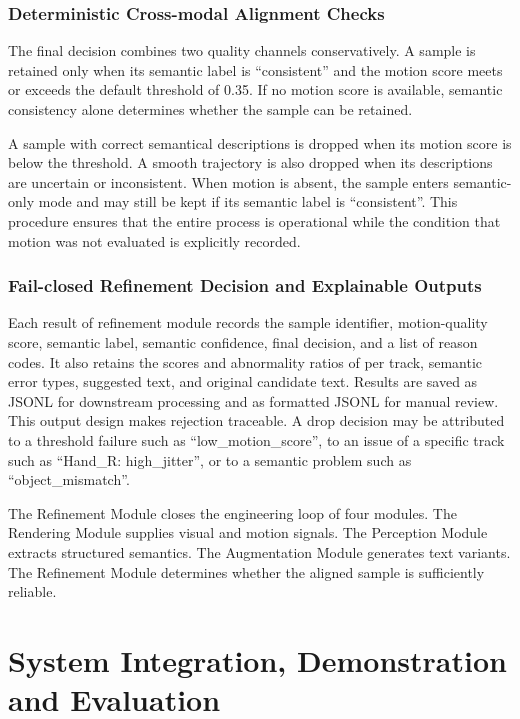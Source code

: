 \documentclass[11pt,oneside]{report}
\begin{document}
\subsection{Deterministic Cross-modal Alignment Checks}

The final decision combines two quality channels conservatively. A sample is retained only when its semantic label is “consistent” and the motion score meets or exceeds the default threshold of 0.35. If no motion score is available, semantic consistency alone determines whether the sample can be retained.

A sample with correct semantical descriptions is dropped when its motion score is below the threshold. A smooth trajectory is also dropped when its descriptions are uncertain or inconsistent. When motion is absent, the sample enters semantic-only mode and may still be kept if its semantic label is “consistent”. This procedure ensures that the entire process is operational while the condition that motion was not evaluated is explicitly recorded.

\subsection{Fail-closed Refinement Decision and Explainable Outputs}

Each result of refinement module records the sample identifier, motion-quality score, semantic label, semantic confidence, final decision, and a list of reason codes. It also retains the scores and abnormality ratios of per track, semantic error types, suggested text, and original candidate text. Results are saved as JSONL for downstream processing and as formatted JSONL for manual review. This output design makes rejection traceable. A drop decision may be attributed to a threshold failure such as “low\_motion\_score”, to an issue of a specific track such as “Hand\_R: high\_jitter”, or to a semantic problem such as “object\_mismatch”.

The Refinement Module closes the engineering loop of four modules. The Rendering Module supplies visual and motion signals. The Perception Module extracts structured semantics. The Augmentation Module generates text variants. The Refinement Module determines whether the aligned sample is sufficiently reliable.


\chapter{System Integration, Demonstration and Evaluation}
\end{document}
